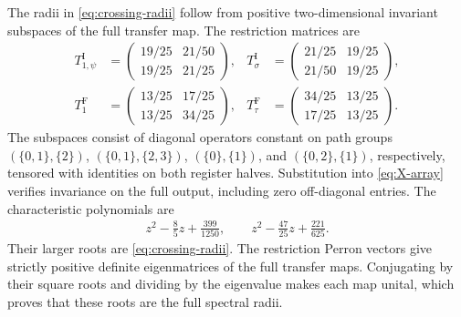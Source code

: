 The radii in \cref{eq:crossing-radii} follow from positive
two-dimensional invariant subspaces of the full transfer map.
The restriction matrices are
\begin{align}
	T_{1,\psi}^{\mathrm I}
	 & =\begin{pmatrix}19/25&21/50\\19/25&21/25\end{pmatrix}, &
	T_\sigma^{\mathrm I}
	 & =\begin{pmatrix}21/25&19/25\\21/50&19/25\end{pmatrix},   \\
	T_1^{\mathrm F}
	 & =\begin{pmatrix}13/25&17/25\\13/25&34/25\end{pmatrix}, &
	T_\tau^{\mathrm F}
	 & =\begin{pmatrix}34/25&13/25\\17/25&13/25\end{pmatrix}.
\end{align}
The subspaces consist of diagonal operators constant on path groups
$(\{0,1\},\{2\})$, $(\{0,1\},\{2,3\})$,
$(\{0\},\{1\})$, and $(\{0,2\},\{1\})$, respectively, tensored
with identities on both register halves. Substitution into
\cref{eq:X-array} verifies invariance on the full output, including
zero off-diagonal entries. The characteristic polynomials are
\begin{align}
	z^2-\frac85z+\frac{399}{1250},\qquad
	z^2-\frac{47}{25}z+\frac{221}{625}.
\end{align}
Their larger roots are \cref{eq:crossing-radii}. The restriction
Perron vectors give strictly positive definite eigenmatrices of
the full transfer maps. Conjugating by their square roots and
dividing by the eigenvalue makes each map unital, which proves
that these roots are the full spectral radii.

